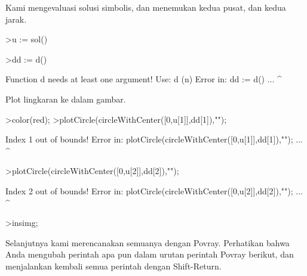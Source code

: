 \documentclass[a4paper,10pt]{article}
\begin{document}
\begin{eulernotebook}
\begin{eulercomment}
\begin{eulercomment}
\begin{eulercomment}
\begin{eulercomment}
\begin{eulercomment}
\begin{eulercomment}
\begin{eulercomment}
\begin{eulercomment}
\begin{eulercomment}
\begin{eulercomment}
\begin{eulercomment}
\begin{eulercomment}
\begin{eulercomment}
\begin{eulercomment}
\begin{eulercomment}
\begin{eulercomment}
\begin{eulercomment}
Kami mengevaluasi solusi simbolis, dan menemukan kedua pusat, dan
kedua jarak.
\end{eulercomment}
\begin{eulerprompt}
>u := sol()
\end{eulerprompt}
\begin{euleroutput}
  []
\end{euleroutput}
\begin{eulerprompt}
>dd := d()
\end{eulerprompt}
\begin{euleroutput}
  Function d needs at least one argument!
  Use: d (n) 
  Error in:
  dd := d() ...
           ^
\end{euleroutput}
\begin{eulercomment}
Plot lingkaran ke dalam gambar.
\end{eulercomment}
\begin{eulerprompt}
>color(red);
>plotCircle(circleWithCenter([0,u[1]],dd[1]),"");
\end{eulerprompt}
\begin{euleroutput}
  Index 1 out of bounds!
  Error in:
  plotCircle(circleWithCenter([0,u[1]],dd[1]),""); ...
                                     ^
\end{euleroutput}
\begin{eulerprompt}
>plotCircle(circleWithCenter([0,u[2]],dd[2]),"");
\end{eulerprompt}
\begin{euleroutput}
  Index 2 out of bounds!
  Error in:
  plotCircle(circleWithCenter([0,u[2]],dd[2]),""); ...
                                     ^
\end{euleroutput}
\begin{eulerprompt}
>insimg;
\end{eulerprompt}
\begin{eulercomment}
Selanjutnya kami merencanakan semuanya dengan Povray. Perhatikan bahwa
Anda mengubah perintah apa pun dalam urutan perintah Povray berikut,
dan menjalankan kembali semua perintah dengan Shift-Return.


\end{eulercomment}
\end{eulercomment}
\end{eulercomment}
\end{eulercomment}
\end{eulercomment}
\end{eulercomment}
\end{eulercomment}
\end{eulercomment}
\end{eulercomment}
\end{eulercomment}
\end{eulercomment}
\end{eulercomment}
\end{eulercomment}
\end{eulercomment}
\end{eulercomment}
\end{eulercomment}
\end{eulercomment}
\end{eulernotebook}
\end{document}
